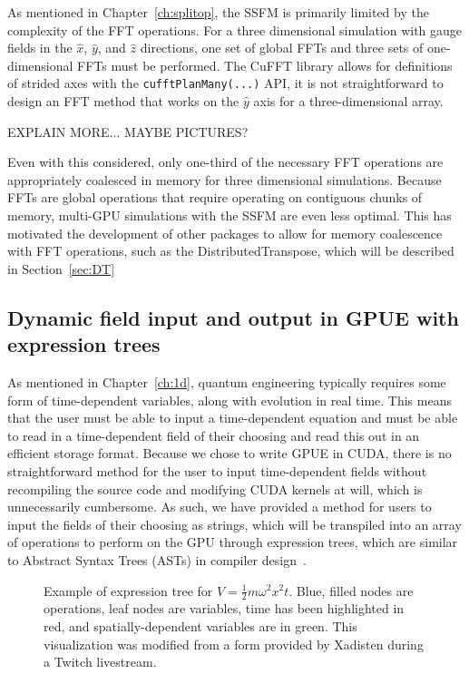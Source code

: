 As mentioned in Chapter~\ref{ch:splitop}, the SSFM is primarily limited by the complexity of the FFT operations.
For a three dimensional simulation with gauge fields in the $\hat x$, $\hat y$, and $\hat z$ directions, one set of global FFTs and three sets of one-dimensional FFTs must be performed.
The CuFFT library allows for definitions of strided axes with the \texttt{cufftPlanMany(...)} API, it is not straightforward to design an FFT method that works on the $\hat y$ axis for a three-dimensional array.

EXPLAIN MORE... MAYBE PICTURES?

Even with this considered, only one-third of the necessary FFT operations are appropriately coalesced in memory for three dimensional simulations.
Because FFTs are global operations that require operating on contiguous chunks of memory, multi-GPU simulations with the SSFM are even less optimal.
This has motivated the development of other packages to allow for memory coalescence with FFT operations, such as the DistributedTranspose, which will be described in Section~\ref{sec:DT}

\subsection{Dynamic field input and output in GPUE with expression trees}

As mentioned in Chapter~\ref{ch:1d}, quantum engineering typically requires some form of time-dependent variables, along with evolution in real time.
This means that the user must be able to input a time-dependent equation and must be able to read in a time-dependent field of their choosing and read this out in an efficient storage format.
Because we chose to write GPUE in CUDA, there is no straightforward method for the user to input time-dependent fields without recompiling the source code and modifying CUDA kernels at will, which is unnecessarily cumbersome.
As such, we have provided a method for users to input the fields of their choosing as strings, which will be transpiled into an array of operations to perform on the GPU through expression trees, which are similar to Abstract Syntax Trees (ASTs) in compiler design~\cite{cohen1991, reyes2011}.

\begin{figure}
\center 
\caption{
Example of expression tree for $V=\frac{1}{2}m \omega^2 x^2 t$.
Blue, filled nodes are operations, leaf nodes are variables, time has been highlighted in red, and spatially-dependent variables are in green.
This visualization was modified from a form provided by Xadisten during a Twitch livestream.
}
\label{fig:expr_tree}
\end{figure}


